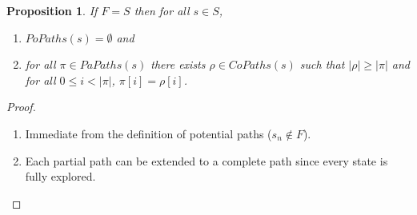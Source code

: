 \documentclass[12pt]{article}
\newtheorem{proposition}{Proposition}
\theoremstyle{definition}
\begin{document}
\begin{proposition}
\label{proposition:no-potential-paths}
If $F= S$ then for all $s \in S$,
\begin{enumerate}
\item
$\mathit{PoPaths}(s) = \emptyset$ and
\item
for all $\pi \in \mathit{PaPaths}(s)$ there exists $\rho \in \mathit{CoPaths}(s)$ such that $|\rho| \geq |\pi|$ and for all $0 \leq i < |\pi|$, $\pi[i] = \rho[i]$.
\end{enumerate}
\end{proposition}
\begin{proof}\ 
\begin{enumerate}
\item 
Immediate from the definition of potential paths ($s_n \not\in F$).
\item
Each partial path can be extended to a complete path since every state is fully explored.
\end{enumerate}
\end{proof}
\end{document}
